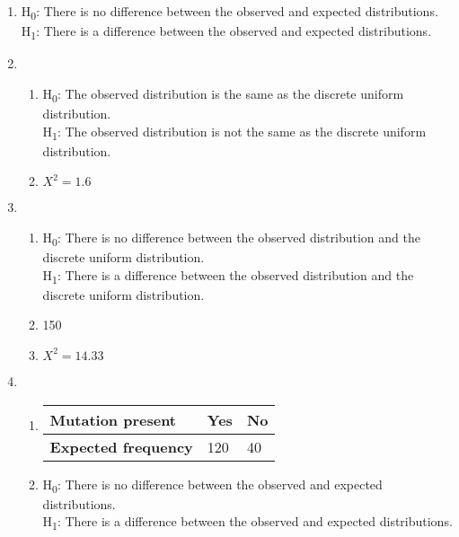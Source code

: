 \documentclass[fleqn]{article}
\begin{document}
\newpage
{}
\begin{enumerate}
    \setlength\itemsep{0.5em}
    \item H\textsubscript{0}: There is no difference between the observed and expected distributions. \\
        H\textsubscript{1}: There is a difference between the observed and expected distributions.
    \item \begin{enumerate}[label=\bfseries \alph*\space ]
            \item H\textsubscript{0}: The observed distribution is the same as the discrete uniform distribution. \\
                H\textsubscript{1}: The observed distribution is not the same as the discrete uniform distribution.
            \item $X^2=1.6$
        \end{enumerate}
    \item \begin{enumerate}[label=\bfseries \alph*\space ]
            \item H\textsubscript{0}: There is no difference between the observed distribution and the discrete uniform distribution. \\
                H\textsubscript{1}: There is a difference between the observed distribution and the discrete uniform distribution.
            \item 150
            \item $X^2=14.33$
        \end{enumerate}
    \item \begin{enumerate}[label=\bfseries \alph*\space ]
            \item \begin{tabularx}{0.4\textwidth}{|X|*2{P{12mm}|}}
                    \hline
                    \textbf{Mutation present}   & Yes  & No  \\\hline
                    \textbf{Expected frequency} & 120  & 40  \\\hline
                \end{tabularx}\vspace{6mm}
            \item H\textsubscript{0}: There is no difference between the observed and expected distributions. \\
                H\textsubscript{1}: There is a difference between the observed and expected distributions.

\end{enumerate}
\end{enumerate}
\end{document}
